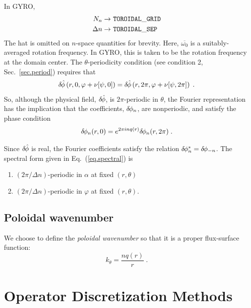 \noindent
In GYRO, 
%
\begin{align*}
N_n \rightarrow &~{\tt TOROIDAL\_GRID} \\
\Delta n \rightarrow &~{\tt TOROIDAL\_SEP}
\end{align*}
%
The hat is omitted on $n$-space quantities for brevity.  Here, 
$\overline{\omega_0}$ is a suitably-averaged rotation frequency.  In
GYRO, this is taken to be the rotation frequency at the domain
center.  The $\theta$-periodicity condition (see condition 2, 
Sec.~\ref{sec.period}) requires that
%
\begin{equation} 
\delta \hskip -1pt \hat{\phi}\left(r,0,\varphi+\nu[\psi,0]\right) = 
\delta \hskip -1pt \hat{\phi}\left(r,2\pi,\varphi+\nu[\psi,2\pi]\right) \; .
\end{equation}
%
So, although the physical field, $\delta \hskip -1pt \hat{\phi}$, is $2\pi$-periodic in 
$\theta$, the Fourier representation has the implication that the 
coefficients, $\delta \hskip -1pt \phi_n$, are nonperiodic, and satisfy the phase 
condition 
%
\begin{equation}
\delta \hskip -1pt \phi_n(r,0) =  e^{2 \pi i n q(r)} \delta \hskip -1pt \phi_n(r,2\pi) \; . 
\label{eq.phase}
\end{equation}

\noindent
Since $\delta \hskip -1pt \hat{\phi}$ is real, the Fourier coefficients satisfy 
the relation $\delta \hskip -1pt \phi_n^* = \delta \hskip -1pt \phi_{-n}$.  The spectral form 
given in Eq.~(\ref{eq.spectral}) is 
\begin{enumerate}
\item
$(2\pi/\Delta n)$-periodic in $\alpha$ at fixed $(r,\theta)$ 
\item
$(2\pi/\Delta n)$-periodic in $\varphi$ at fixed $(r,\theta)$.
\end{enumerate}

\subsection{Poloidal wavenumber}

We choose to define the {\it poloidal wavenumber} so that it is a 
proper flux-surface function:
%
\begin{equation}
k_\theta = \frac{n q(r)}{r} \; .
\end{equation}

\section{Operator Discretization Methods}

